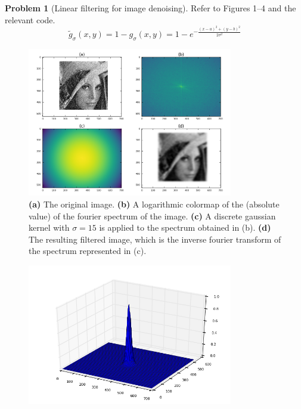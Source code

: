 \documentclass[10pt]{article}
\theoremstyle{plain}
\theoremstyle{definition}
\newtheorem{prob}{Problem}
\renewcommand{\tilde}[1]{\widetilde{#1}}%
\numberwithin{equation}{section}
\begin{document}
\hrulefill
\newpage
\begin{prob}[Linear filtering for image denoising]
    Refer to Figures 1--4 and the relevant code.
    \[
        \tilde{g}_\sigma(x,y) = 1 - g_\sigma(x,y) = 1 - e^{-\frac{(x-a)^2 + (y-b)^2}{2\sigma^2}}
    \]
     
\begin{figure}[p]
    \begin{center}
        \includegraphics[width=0.8\textwidth]{prob4}
        \caption{
            \textbf{(a)} The original image.
            \textbf{(b)} A logarithmic colormap of the (absolute value) of the fourier spectrum of the image.
            \textbf{(c)} A discrete gaussian kernel with $\sigma=15$ is applied to the spectrum obtained in (b).
            \textbf{(d)} The resulting filtered image, which is the inverse fourier transform of the spectrum
                         represented in (c).
                     }
    \end{center}
\end{figure}
\begin{figure}[p]
    \begin{center}
        \includegraphics[width=0.8\textwidth]{p4-gaussian15}

\end{center}
\end{figure}
\end{prob}
\end{document}
